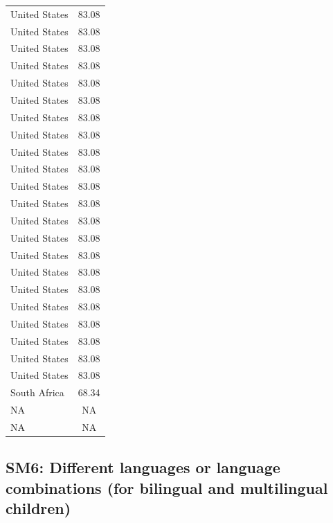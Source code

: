 \documentclass[
]{article}
\begin{document}
\begin{center}
\begin{ThreePartTable}
\begin{longtable}{lc}
United States & 83.08\\
United States & 83.08\\
United States & 83.08\\
United States & 83.08\\
United States & 83.08\\
United States & 83.08\\
United States & 83.08\\
United States & 83.08\\
United States & 83.08\\
United States & 83.08\\
United States & 83.08\\
United States & 83.08\\
United States & 83.08\\
United States & 83.08\\
United States & 83.08\\
United States & 83.08\\
United States & 83.08\\
United States & 83.08\\
United States & 83.08\\
United States & 83.08\\
United States & 83.08\\
United States & 83.08\\
South Africa & 68.34\\
NA & NA\\
NA & NA\\
\bottomrule
\end{longtable}

\end{ThreePartTable}
\end{center}

\hypertarget{sm6-different-languages-or-language-combinations-for-bilingual-and-multilingual-children}{%
\subsection{SM6: Different languages or language combinations (for
bilingual and multilingual
children)}\label{sm6-different-languages-or-language-combinations-for-bilingual-and-multilingual-children}}
\end{document}
